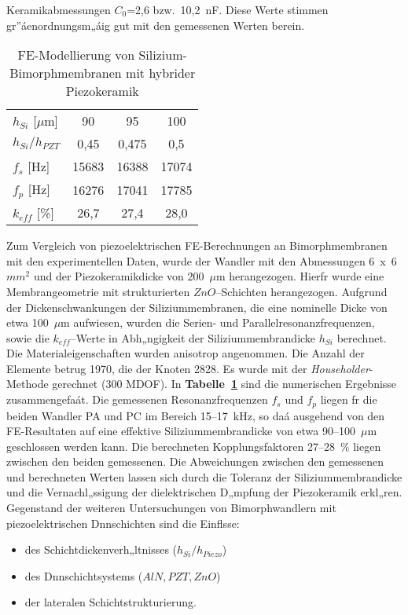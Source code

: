 Keramikabmessungen $C_{0}$=2,6 bzw.\ 10,2~nF. Diese Werte stimmen
gr”áenordnungsm„áig gut mit den gemessenen Werten berein.\\
%
%
\begin{table}[htb]
\caption{\label{tabpiezosim}
 FE-Modellierung von Silizium-Bimorphmembranen mit hybrider Piezokeramik}
\begin{center}
\begin{tabular} {|l||c|c|c|}
\hline
 $h_{Si}$ [$\mu$m]  & 90   & 95    & 100  \\
 $h_{Si}/h_{PZT}$   & 0,45 & 0,475 & 0,5  \\
\hline \hline
 $f_{s}$ [Hz]       & 15683 & 16388 & 17074  \\
 $f_{p}$ [Hz]       & 16276 & 17041 & 17785  \\
\hline
 $k_{eff}$ [\%]     & 26,7 & 27,4 & 28,0 \\
\hline
\end{tabular}
\end{center}
\end{table}
Zum Vergleich von piezoelektrischen FE-Berechnungen an Bimorphmembranen
mit den experimentellen Daten, wurde der Wandler mit den Abmessungen
6~x~6~$mm^{2}$ und der Piezokeramikdicke von 200~$\mu$m herangezogen.
Hierfr wurde eine Membrangeometrie mit strukturierten $ZnO$--Schichten
herangezogen. %
Aufgrund der Dickenschwankungen der
Siliziummembranen, die eine nominelle Dicke von etwa 100~$\mu$m aufwiesen,
wurden die Serien- und Parallelresonanzfrequenzen, sowie die
$k_{eff}$--Werte in Abh„ngigkeit der Siliziummembrandicke $h_{Si}$
berechnet. Die Materialeigenschaften wurden anisotrop angenommen. Die
Anzahl der Elemente betrug 1970, die der Knoten 2828. Es wurde mit der
{\sl Householder}-Methode gerechnet (300 MDOF).
In {\bf Tabelle~\ref{tabpiezosim}} sind die numerischen Ergebnisse
zusammengefaát. Die gemessenen Resonanzfrequenzen $f_{s}$ und $f_{p}$ liegen
fr die beiden Wandler PA und PC im Bereich 15--17~kHz, so daá ausgehend
von den FE-Resultaten auf eine effektive Siliziummembrandicke von etwa
90--100~$\mu$m geschlossen werden kann. Die berechneten Kopplungsfaktoren
27--28~\% liegen zwischen den beiden gemessenen. Die Abweichungen zwischen
den gemessenen und berechneten Werten lassen sich durch die Toleranz der
Siliziummembrandicke und die Vernachl„ssigung der dielektrischen D„mpfung
der Piezokeramik erkl„ren.\\
%
Gegenstand der weiteren Untersuchungen von Bimorphwandlern mit
piezoelektrischen Dnnschichten sind die Einflsse:
\begin{itemize}
\item des Schichtdickenverh„ltnisses ($h_{Si}/h_{Piezo}$)
\item des Dnnschichtsystems ($AlN, PZT, ZnO$)
\item der lateralen Schichtstrukturierung.
\end{itemize}



